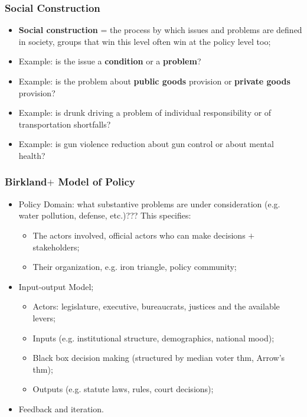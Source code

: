 \documentclass[aspectratio=169]{beamer}
\theoremstyle{principle}
\begin{document}
\begin{frame}
\frametitle{Social Construction}
\begin{itemize}
\item \textbf{Social construction} = the process by which issues and problems are defined in society, groups that win this level often win at the policy level too;
\bigskip
\item Example: is the issue a \textbf{condition} or a \textbf{problem}?
\bigskip
\item Example: is the problem about \textbf{public goods} provision or \textbf{private goods} provision?
\bigskip
\item Example: is drunk driving a problem of individual responsibility or of transportation shortfalls?
\bigskip
\item Example: is gun violence reduction about gun control or about mental health?
\end{itemize}
\end{frame}

\begin{frame}
\frametitle{Birkland$+$ Model of Policy}
\begin{itemize}
\item Policy Domain: what substantive problems are under consideration (e.g. water pollution, defense, etc.)???  This specifies:
\begin{itemize}
\item The actors involved, official actors who can make decisions $+$ stakeholders; 
\item Their organization, e.g. iron triangle, policy community;
\end{itemize} 
\bigskip
\item \color{black}Input-output Model;
\begin{itemize}
\item Actors: legislature, executive, bureaucrats, justices and the available levers;
\item Inputs (e.g. institutional structure, demographics, national mood);
\item Black box decision making (structured by median voter thm, Arrow's thm);
\item Outputs (e.g. statute laws, rules, court decisions);
\end{itemize}
\bigskip
\item Feedback and iteration.
\end{itemize}
\end{frame}
\end{document}
